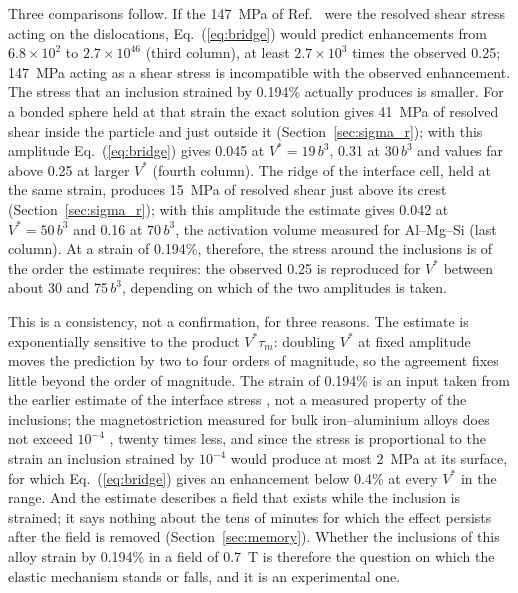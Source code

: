 Three comparisons follow. If the 147~MPa of Ref.~\cite{Friha2024JMMM} were
the resolved shear stress acting on the dislocations, Eq.~(\ref{eq:bridge})
would predict enhancements from $6.8\times10^{2}$ to $2.7\times10^{46}$
(third column), at least $2.7\times10^{3}$ times the observed 0.25; 147~MPa
acting as a shear stress is incompatible with the observed enhancement. The
stress that an inclusion strained by 0.194\% actually produces is smaller.
For a bonded sphere held at that strain the exact solution \cite{Eshelby1957}
gives 41~MPa of resolved shear inside the particle and just outside it (Section~\ref{sec:sigma_r});
with this amplitude Eq.~(\ref{eq:bridge}) gives 0.045 at $V^{*}=19\,b^{3}$,
0.31 at $30\,b^{3}$ and values far above 0.25 at larger $V^{*}$ (fourth
column). The ridge of the interface cell, held at the same strain, produces
15~MPa of resolved shear just above its crest
(Section~\ref{sec:sigma_r}); with this amplitude the estimate gives
0.042 at $V^{*}=50\,b^{3}$ and 0.16 at $70\,b^{3}$, the
activation volume measured for Al--Mg--Si \cite{Soula2022JALCOM} (last
column). At a strain of 0.194\%, therefore, the stress around the inclusions
is of the order the estimate requires: the observed 0.25 is reproduced for
$V^{*}$ between about 30 and 75$\,b^{3}$, depending on which
of the two amplitudes is taken.

This is a consistency, not a confirmation, for three reasons. The estimate
is exponentially sensitive to the product $V^{*}\tau_m$: doubling $V^{*}$ at
fixed amplitude moves the prediction by two to four orders of magnitude, so
the agreement fixes little beyond the order of magnitude. The strain of
0.194\% is an input taken from the earlier estimate of the interface stress
\cite{Friha2024JMMM}, not a measured property of the inclusions; the
magnetostriction measured for bulk iron--aluminium alloys does not exceed
$10^{-4}$ \cite{Hall1959,BormioNunes2012}, twenty times less, and since the
stress is proportional to the strain an inclusion strained by $10^{-4}$ would
produce at most 2~MPa at its surface, for which Eq.~(\ref{eq:bridge}) gives
an enhancement below 0.4\% at every $V^{*}$ in the range. And the estimate
describes a field that exists while the inclusion is strained; it says
nothing about the tens of minutes for which the effect persists after the
field is removed (Section~\ref{sec:memory}). Whether the inclusions of this
alloy strain by 0.194\% in a field of 0.7~T is therefore the question on
which the elastic mechanism stands or falls, and it is an experimental one.

